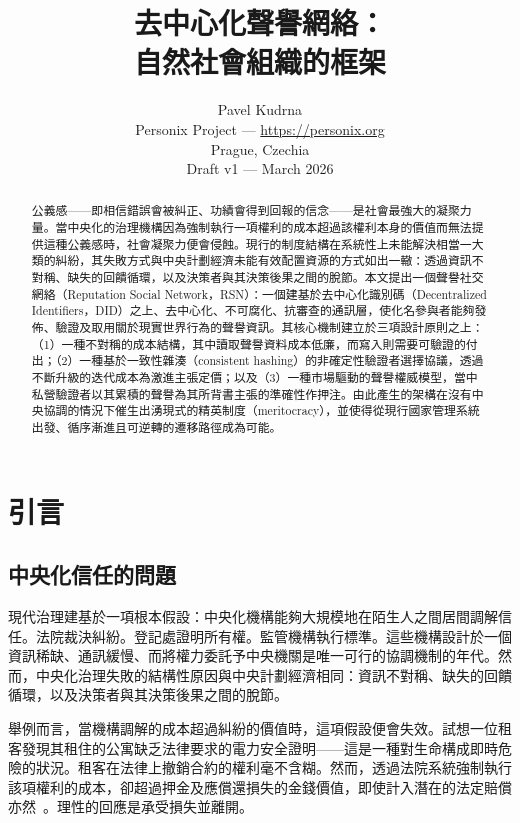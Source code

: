 \documentclass[11pt,a4paper,twocolumn]{article}
\title{\textbf{去中心化聲譽網絡：\\自然社會組織的框架}}
\author{Pavel Kudrna\\Personix Project --- \url{https://personix.org}\\Prague, Czechia\\Draft v1 --- March 2026}
\date{}
\begin{document}
\maketitle

\begin{abstract}
公義感——即相信錯誤會被糾正、功績會得到回報的信念——是社會最強大的凝聚力量。當中央化的治理機構因為強制執行一項權利的成本超過該權利本身的價值而無法提供這種公義感時，社會凝聚力便會侵蝕。現行的制度結構在系統性上未能解決相當一大類的糾紛，其失敗方式與中央計劃經濟未能有效配置資源的方式如出一轍：透過資訊不對稱、缺失的回饋循環，以及決策者與其決策後果之間的脫節。本文提出一個聲譽社交網絡（Reputation Social Network，RSN）：一個建基於去中心化識別碼（Decentralized Identifiers，DID）之上、去中心化、不可腐化、抗審查的通訊層，使化名參與者能夠發佈、驗證及取用關於現實世界行為的聲譽資訊。其核心機制建立於三項設計原則之上：（1）一種不對稱的成本結構，其中讀取聲譽資料成本低廉，而寫入則需要可驗證的付出；（2）一種基於一致性雜湊（consistent hashing）的非確定性驗證者選擇協議，透過不斷升級的迭代成本為激進主張定價；以及（3）一種市場驅動的聲譽權威模型，當中私營驗證者以其累積的聲譽為其所背書主張的準確性作押注。由此產生的架構在沒有中央協調的情況下催生出湧現式的精英制度（meritocracy），並使得從現行國家管理系統出發、循序漸進且可逆轉的遷移路徑成為可能。
\end{abstract}

\section{引言}

\subsection{中央化信任的問題}

現代治理建基於一項根本假設：中央化機構能夠大規模地在陌生人之間居間調解信任。法院裁決糾紛。登記處證明所有權。監管機構執行標準。這些機構設計於一個資訊稀缺、通訊緩慢、而將權力委託予中央機關是唯一可行的協調機制的年代。然而，中央化治理失敗的結構性原因與中央計劃經濟相同：資訊不對稱、缺失的回饋循環，以及決策者與其決策後果之間的脫節。

舉例而言，當機構調解的成本超過糾紛的價值時，這項假設便會失效。試想一位租客發現其租住的公寓缺乏法律要求的電力安全證明——這是一種對生命構成即時危險的狀況。租客在法律上撤銷合約的權利毫不含糊。然而，透過法院系統強制執行該項權利的成本，卻超過押金及應償還損失的金錢價值，即使計入潛在的法定賠償亦然~\cite{czcourtfees}。理性的回應是承受損失並離開。
\end{document}
